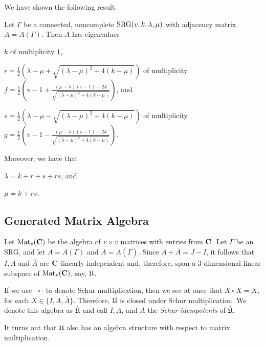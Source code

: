 \documentclass[../../../main]{subfiles}
\begin{document}
We have shown the following result.

\begin{thm}
 Let $\Gamma$ be a connected, noncomplete $\text{SRG}(v,k,\lambda,\mu)$ with adjacency matrix $A=A(\Gamma)$. Then $A$ has eigenvalues
 \begin{defenum}
  \item $k$ of multiplicity $1$,
  \item $r=\frac{1}{2}(\lambda-\mu+\sqrt{(\lambda-\mu)^2+4(k-\mu)})$ of multiplicity \\ $f=\frac{1}{2}\left(v-1+\frac{(\mu-\lambda)(v-1)-2k}{\sqrt{(\lambda-\mu)^2+4(k-\mu)}}\right)$, and
  \item $s=\frac{1}{2}(\lambda-\mu-\sqrt{(\lambda-\mu)^2+4(k-\mu)})$ of multiplicity \\ $g=\frac{1}{2}\left(v-1-\frac{(\mu-\lambda)(v-1)-2k}{\sqrt{(\lambda-\mu)^2+4(k-\mu)}}\right)$. 
 \end{defenum}
 Moreover, we have that
 \begin{defenum}[resume]
  \item $\lambda = k+r+s+rs$, and
  \item $\mu=k + rs$.
 \end{defenum}
\end{thm}

\dinkus

\subsection{Generated Matrix Algebra}

Let $\text{Mat}_v(\mathbf{C})$ be the algebra of $v \times v$ matrices with entries from $\mathbf{C}$. Let $\Gamma$ be an SRG, and let $A=A(\Gamma)$ and $\bar A = A(\bar\Gamma)$. Since $A + \bar A = J-I$, it follows that $I,A$ and $\bar A$ are $\mathbf{C}$-linearly independent and, therefore, span a 3-dimensional linear subspace of $\text{Mat}_v(\mathbf{C})$, say, $\mathfrak{U}$. 

If we use $\cdot\circ\cdot$ to denote Schur multiplication, then we see at once that $X \circ X=X$, for each $X \in \{I,A,\bar A\}$. Therefore, $\mathfrak{U}$ is closed under Schur multiplication. We denote this algebra as $\hat {\mathfrak{U}}$ and call $I,A$, and $\bar A$ the {\it Schur idempotents} of $\hat {\mathfrak{U}}$.

It turns out that $\mathfrak{U}$ also has an algebra structure with respect to matrix multiplication.
\end{document}

